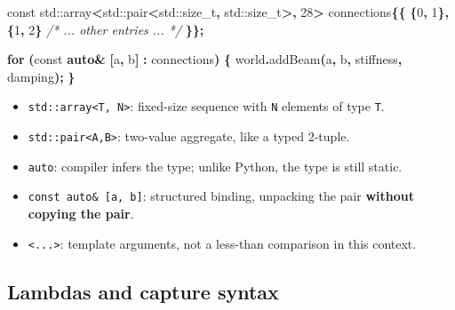 \documentclass[
  10pt,
  a4paper,
]{article}
\newenvironment{Shaded}{\begin{snugshade}}{\end{snugshade}}
\newcommand{\AttributeTok}[1]{\textcolor[rgb]{0.13,0.29,0.53}{#1}}
\newcommand{\BuiltInTok}[1]{#1}
\newcommand{\CommentTok}[1]{\textcolor[rgb]{0.56,0.35,0.01}{\textit{#1}}}
\newcommand{\ControlFlowTok}[1]{\textcolor[rgb]{0.13,0.29,0.53}{\textbf{#1}}}
\newcommand{\DecValTok}[1]{\textcolor[rgb]{0.00,0.00,0.81}{#1}}
\newcommand{\KeywordTok}[1]{\textcolor[rgb]{0.13,0.29,0.53}{\textbf{#1}}}
\newcommand{\NormalTok}[1]{#1}
\newcommand{\OperatorTok}[1]{\textcolor[rgb]{0.81,0.36,0.00}{\textbf{#1}}}
\providecommand{\tightlist}{%
  \setlength{\itemsep}{0pt}\setlength{\parskip}{0pt}}
\begin{document}
\begin{Shaded}
\begin{Highlighting}[]
\AttributeTok{const} \BuiltInTok{std::}\NormalTok{array}\OperatorTok{\textless{}}\BuiltInTok{std::}\NormalTok{pair}\OperatorTok{\textless{}}\BuiltInTok{std::}\NormalTok{size\_t}\OperatorTok{,} \BuiltInTok{std::}\NormalTok{size\_t}\OperatorTok{\textgreater{},} \DecValTok{28}\OperatorTok{\textgreater{}}\NormalTok{ connections}\OperatorTok{\{\{}
    \OperatorTok{\{}\DecValTok{0}\OperatorTok{,} \DecValTok{1}\OperatorTok{\},} \OperatorTok{\{}\DecValTok{1}\OperatorTok{,} \DecValTok{2}\OperatorTok{\}} \CommentTok{/* ... other entries ... */}
\OperatorTok{\}\};}

\ControlFlowTok{for} \OperatorTok{(}\AttributeTok{const} \KeywordTok{auto}\OperatorTok{\&} \OperatorTok{[}\NormalTok{a}\OperatorTok{,}\NormalTok{ b}\OperatorTok{]} \OperatorTok{:}\NormalTok{ connections}\OperatorTok{)} \OperatorTok{\{}
\NormalTok{    world}\OperatorTok{.}\NormalTok{addBeam}\OperatorTok{(}\NormalTok{a}\OperatorTok{,}\NormalTok{ b}\OperatorTok{,}\NormalTok{ stiffness}\OperatorTok{,}\NormalTok{ damping}\OperatorTok{);}
\OperatorTok{\}}
\end{Highlighting}
\end{Shaded}

\begin{itemize}
\tightlist
\item
  \texttt{std::array\textless{}T,\ N\textgreater{}}: fixed-size sequence
  with \texttt{N} elements of type \texttt{T}.
\item
  \texttt{std::pair\textless{}A,B\textgreater{}}: two-value aggregate,
  like a typed 2-tuple.
\item
  \texttt{auto}: compiler infers the type; unlike Python, the type is
  still static.
\item
  \texttt{const\ auto\&\ {[}a,\ b{]}}: structured binding, unpacking the
  pair \textbf{without copying the pair}.
\item
  \texttt{\textless{}...\textgreater{}}: template arguments, not a
  less-than comparison in this context.
\end{itemize}

\subsection{Lambdas and capture
syntax}\label{lambdas-and-capture-syntax}
\end{document}
